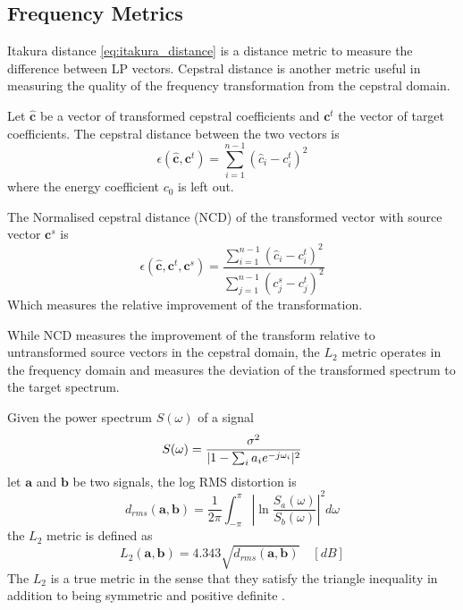 \subsection{Frequency Metrics} %
\label{sub:frequency_metrics}
Itakura distance \eqref{eq:itakura_distance} is a distance metric to measure the difference between LP vectors. Cepstral distance is another metric useful in measuring the quality of the frequency transformation from the cepstral domain. 
\begin{definition}
	Let $\hat{\mathbf{c}}$ be a vector of transformed cepstral coefficients and $\mathbf{c}^t$ the vector of target coefficients. The cepstral distance between the two vectors is
	\begin{equation}
		\label{eq:cepstral_distance}
		\epsilon(\hat{\mathbf{c}},\mathbf{c}^t) = \sum_{i=1}^{n-1}(\hat{c}_{i}-c_{i}^t)^2
	\end{equation}
	where the energy coefficient $c_0$ is left out.
	
	The Normalised cepstral distance (NCD) of the transformed vector with source vector $\mathbf{c}^s$ is
	\begin{equation}
		\label{eq:ncd}
		\epsilon(\hat{\mathbf{c}},\mathbf{c}^t,\mathbf{c}^s) = \frac{{\sum}_{i=1}^{n-1}(\hat{c}_{i}-c_{i}^t)^2}{\sum_{j=1}^{n-1}(c_{j}^s-c_{j}^t)^2}
	\end{equation}
	Which measures the relative improvement of the transformation.
\end{definition}

While NCD measures the improvement of the transform relative to untransformed source vectors in the cepstral domain, the $L_2$ metric operates in the frequency domain and measures the deviation of the transformed spectrum to the target spectrum.

\begin{definition}
	Given the power spectrum $S(\omega)$ of a signal
\begin{equation}
	S(\omega) = \frac{\sigma^2}{\lvert1-\sum_{i}a_i e^{-j\omega_i}\rvert^2}
\end{equation}
let $\mathbf{a}$ and $\mathbf{b}$ be two signals, the log RMS distortion is
\begin{equation}
	d_{rms}(\mathbf{a},\mathbf{b}) = \frac{1}{2\pi}\int_{-\pi}^{\pi}\left\lvert\ln \frac{S_a(\omega)}{S_b(\omega)}\right\rvert^2 d\omega
\end{equation}
the $L_2$ metric is defined as \cite{gray76}
\begin{equation}
	\label{eq:l2_metric}
	L_2(\mathbf{a},\mathbf{b})  = 4.343 \sqrt{d_{rms}(\mathbf{a},\mathbf{b})} \quad [dB]
\end{equation}
The $L_2$ is a true metric in the sense that they satisfy the triangle inequality in addition to being symmetric and positive definite \cite{kreyszig89}.
\end{definition}

